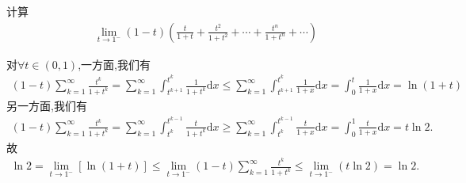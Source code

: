 \documentclass[../../main.tex]{subfiles}%
\begin{document}
\begin{example}
计算
\begin{align*}
\lim_{t\rightarrow 1^-} (1-t)\left( \frac{t}{1+t}+\frac{t^2}{1+t^2}+\cdots +\frac{t^n}{1+t^n}+\cdots \right)
\end{align*}
\end{example}
\begin{solution}

对$\forall t \in (0,1)$,一方面,我们有
\begin{align*}
\left( 1-t \right) \sum\limits_{k=1}^{\infty}{\frac{t^k}{1+t^k}}=\sum\limits_{k=1}^{\infty}{\int_{t^{k+1}}^{t^k}{\frac{1}{1+t^k}\mathrm{d}x}}\leqslant \sum\limits_{k=1}^{\infty}{\int_{t^{k+1}}^{t^k}{\frac{1}{1+x}\mathrm{d}x}}=\int_0^t{\frac{1}{1+x}\mathrm{d}x}=\ln \left( 1+t \right)
\end{align*}
另一方面,我们有
\begin{align*}
\left( 1-t \right) \sum\limits_{k=1}^{\infty}{\frac{t^k}{1+t^k}}=\sum\limits_{k=1}^{\infty}{\int_{t^k}^{t^{k-1}}{\frac{t}{1+t^k}\mathrm{d}x}}\geqslant \sum\limits_{k=1}^{\infty}{\int_{t^k}^{t^{k-1}}{\frac{t}{1+x}\mathrm{d}x}}=\int_0^1{\frac{t}{1+x}\mathrm{d}x}=t\ln 2.
\end{align*}
故
\begin{align*}
\ln 2=\lim_{t\rightarrow 1^-} \left[ \ln \left( 1+t \right) \right] \leqslant \lim_{t\rightarrow 1^-} \left( 1-t \right) \sum\limits_{k=1}^{\infty}{\frac{t^k}{1+t^k}}\leqslant \lim_{t\rightarrow 1^-} \left( t\ln 2 \right) =\ln 2.
\end{align*}

\end{solution}
\end{document}
